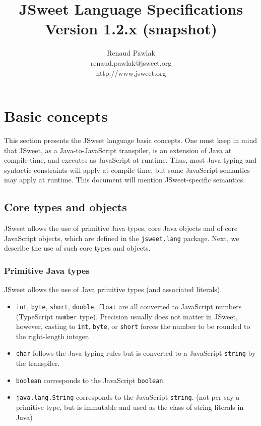 \documentclass[a4paper]{report}
\begin{document}
\title{JSweet Language Specifications\\{\large Version 1.2.x (snapshot)}}
\author{%
Renaud Pawlak\\
{\normalsize renaud.pawlak@jsweet.org}\\
{\normalsize http://www.jsweet.org}\\
}%
\date{}
\maketitle

\tableofcontents

\chapter{Basic concepts} 

This section presents the JSweet language basic concepts. One must keep in mind that JSweet, as a Java-to-JavaScript transpiler, is an extension of Java at compile-time, and executes as JavaScript at runtime. Thus, most Java typing and syntactic constraints will apply at compile time, but some JavaScript semantics may apply at runtime. This document will mention JSweet-specific semantics.

\section{Core types and objects}

JSweet allows the use of primitive Java types, core Java objects and of core JavaScript objects, which are defined in the \texttt{jsweet.lang} package. Next, we describe the use of such core types and objects.

\subsection{Primitive Java types}

JSweet allows the use of Java primitive types (and associated literals).

\begin{itemize}
\item \texttt{int}, \texttt{byte}, \texttt{short}, \texttt{double}, \texttt{float} are all converted to JavaScript numbers (TypeScript \texttt{number} type). Precision usually does not matter in JSweet, however, casting to \texttt{int}, \texttt{byte}, or \texttt{short} forces the number to be rounded to the right-length integer.
\item \texttt{char} follows the Java typing rules but is converted to a JavaScript \texttt{string} by the transpiler.
\item \texttt{boolean} corresponds to the JavaScript \texttt{boolean}.
\item \texttt{java.lang.String} corresponds to the JavaScript \texttt{string}. (not per say a primitive type, but is immutable and used as the class of string literals in Java)
\end{itemize}
\end{document}
